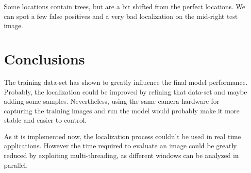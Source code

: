 \documentclass[]{report}
\begin{document}
\vspace{0.5cm}

Some locations contain trees, but are a bit shifted from the perfect locations. We can spot a few false positives and a very bad localization on the mid-right test image.

\section{Conclusions}
The training data-set has shown to greatly influence the final model performance. Probably, the localization could be improved by refining that data-set and maybe adding some samples. Nevertheless, using the same camera hardware for capturing the training images and run the model would probably make it more stable and easier to control.

As it is implemented now, the localization process couldn't be used in real time applications. However the time required to evaluate an image could be greatly reduced by exploiting multi-threading, as different windows can be analyzed in parallel.
\end{document}
